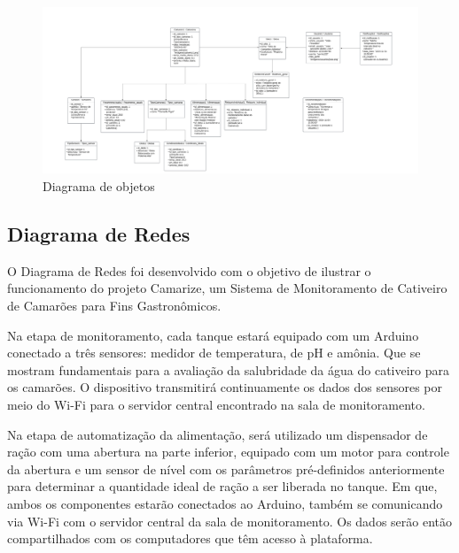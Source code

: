 \documentclass[
  a4paper,
  12pt,
  english,
  brazilian,
]{article}
\begin{document}
    \begin{figure}[!h]
        \centering
        \caption{Diagrama de objetos}%
        \label{fig:diagrama-objetos}
         \includegraphics[width=1\textwidth]{Imagem/Diagrama de Objetos.jpg}
        \end{figure}

    \newpage
       
    \subsection*{\textbf{Diagrama de Redes}}

    O Diagrama de Redes foi desenvolvido com o objetivo de ilustrar o funcionamento do projeto Camarize, um Sistema de Monitoramento de Cativeiro de Camarões para Fins Gastronômicos.

    Na etapa de monitoramento, cada tanque estará equipado com um Arduino conectado a três sensores: medidor de temperatura, de pH e amônia. Que se mostram fundamentais para a avaliação da salubridade da água do cativeiro para os camarões. O dispositivo transmitirá continuamente os dados dos sensores por meio do Wi-Fi para o servidor central encontrado na sala de monitoramento.

    Na etapa de automatização da alimentação, será utilizado um dispensador de ração com uma abertura na parte inferior, equipado com um motor para controle da abertura e um sensor de nível com os parâmetros pré-definidos anteriormente para determinar a quantidade ideal de ração a ser liberada no tanque. Em que, ambos os componentes estarão conectados ao Arduino, também se comunicando via Wi-Fi com o servidor central da sala de monitoramento. Os dados serão então compartilhados com os computadores que têm acesso à plataforma.
\end{document}
